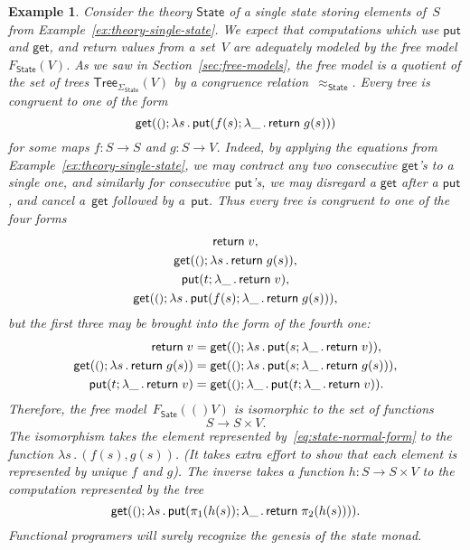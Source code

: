 \documentclass{amsart}
\newcommand{\theory}[1]{\mathsf{#1}} %
\newcommand{\signature}[1]{\Sigma_{\theory{#1}}} %
\newcommand{\Free}[2]{F_{\theory{#1}}(#2)} %
\newcommand{\lam}[1]{\lambda #1 \,.\,}
\newcommand{\Tree}[2]{\mathsf{Tree}_{#1}(#2)} %
\newcommand{\unit}{{\text{\small$()$}}} %
\newcommand{\kode}[1]{\mathsf{#1}}
\newcommand{\opcall}[3]{\kode{#1}(#2; #3)}
\newcommand{\return}[1]{\kode{return}\;#1}
\newtheorem{example}[definition]{Example}
\begin{document}
\begin{example}
  Consider the theory $\theory{State}$ of a single state storing elements of~$S$
  from Example~\ref{ex:theory-single-state}. We expect that computations which
  use $\kode{put}$ and $\kode{get}$, and return values from a set~$V$ are
  adequately modeled by the free model $\Free{State}{V}$. As we saw in
  Section~\ref{sec:free-models}, the free model is a quotient of the set of
  trees $\Tree{\signature{State}}{V}$ by a congruence
  relation~$\approx_{\theory{State}}$. Every tree is congruent to one of the
  form
  \begin{equation}
    \label{eq:state-normal-form}
    \opcall{get}{\unit}{
      \lam{s} \opcall{put}{f(s)}{\lam{\_} \return{g(s)}}
    }
  \end{equation}
  for some maps $f : S \to S$ and $g : S \to V$. Indeed, by applying the
  equations from Example~\ref{ex:theory-single-state}, we may contract any two
  consecutive $\kode{get}$'s to a single one, and similarly for consecutive
  $\kode{put}$'s, we may disregard a $\kode{get}$ after a $\kode{put}$, and
  cancel a~$\kode{get}$ followed by a~$\kode{put}$. Thus every tree is congruent
  to one of the four forms
  \begin{gather*}
    \return{v},\\
    \opcall{get}{\unit}{\lam{s} \return{g(s)}},\\
    \opcall{put}{t}{\lam{\_} \return{v}},\\
    \opcall{get}{\unit}{
      \lam{s} \opcall{put}{f(s)}{\lam{\_} \return{g(s)}}
    },
  \end{gather*}
  but the first three may be brought into the form of the fourth one:
  \begin{align*}
    \return{v} &= 
    \opcall{get}{\unit}{\lam{s} \opcall{put}{s}{\lam{\_} \return{v}}},
    \\
    \opcall{get}{\unit}{\lam{s} \return{g(s)}} &=
    \opcall{get}{\unit}{\lam{s} \opcall{put}{s}{\lam{\_} \return{g(s)}}},
    \\
    \opcall{put}{t}{\lam{\_} \return{v}} &=
    \opcall{get}{\unit}{\lam{\_} \opcall{put}{t}{\lam{\_} \return{v}}}.
  \end{align*}
  Therefore, the free model~$\Free{Sate}(V)$ is isomorphic to the set of
  functions
  \begin{equation*}
    S \to S \times V.
  \end{equation*}
  The isomorphism takes the element represented by~\eqref{eq:state-normal-form}
  to the function $\lam{s} (f(s), g(s))$. (It takes extra effort to show that
  each element is represented by unique $f$ and $g$). The inverse takes a
  function $h : S \to S \times V$ to the computation represented by the tree
  \begin{equation*}
    \opcall{get}{\unit}{
      \lam{s} \opcall{put}{\pi_1(h(s))}{\lam{\_} \return{\pi_2(h(s))}}
    }.
  \end{equation*}
  Functional programers will surely recognize the genesis of the state monad.
\end{example}
\end{document}
